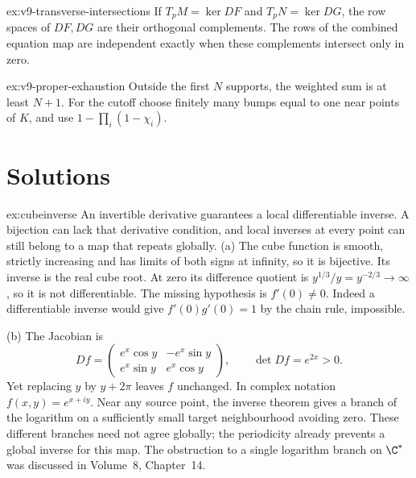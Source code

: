 \begin{hint}{ex:v9-transverse-intersections}
If $T_pM=\ker DF$ and $T_pN=\ker DG$, the row spaces of $DF,DG$ are their orthogonal complements. The rows of the combined equation map are independent exactly when these complements intersect only in zero.
\end{hint}
\begin{hint}{ex:v9-proper-exhaustion}
Outside the first $N$ supports, the weighted sum is at least $N+1$. For the cutoff choose finitely many bumps equal to one near points of $K$, and use $1-\prod_i(1-\chi_i)$.
\end{hint}

\section{Solutions}

\begin{solution}{ex:cubeinverse}
\idea An invertible derivative guarantees a local differentiable inverse. A bijection can lack that derivative condition, and local inverses at every point can still belong to a map that repeats globally.
\writeup (a) The cube function is smooth, strictly increasing and has limits of both signs at infinity, so it is bijective. Its inverse is the real cube root. At zero its difference quotient is $y^{1/3}/y=y^{-2/3}\to\infty$, so it is not differentiable. The missing hypothesis is $f'(0)\ne0$. Indeed a differentiable inverse would give $f'(0)g'(0)=1$ by the chain rule, impossible.

(b) The Jacobian is
\[
Df=\begin{pmatrix}e^x\cos y&-e^x\sin y\\e^x\sin y&e^x\cos y\end{pmatrix},
\qquad\det Df=e^{2x}>0.
\]
Yet replacing $y$ by $y+2\pi$ leaves $f$ unchanged. In complex notation $f(x,y)=e^{x+iy}$. Near any source point, the inverse theorem gives a branch of the logarithm on a sufficiently small target neighbourhood avoiding zero. These different branches need not agree globally; the periodicity already prevents a global inverse for this map. The obstruction to a single logarithm branch on $\C^*$ was discussed in Volume~8, Chapter~14.
\end{solution}

